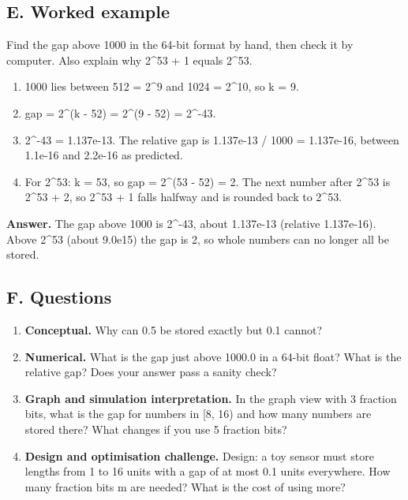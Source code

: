\documentclass[11pt,a4paper]{article}
\begin{document}
\subsection*{E. Worked example}
Find the gap above 1000 in the 64-bit format by hand, then check it by computer. Also explain why 2\textasciicircum{}53 + 1 equals 2\textasciicircum{}53.
\begin{enumerate}[nosep]
\item 1000 lies between 512 = 2\textasciicircum{}9 and 1024 = 2\textasciicircum{}10, so k = 9.
\item gap = 2\textasciicircum{}(k - 52) = 2\textasciicircum{}(9 - 52) = 2\textasciicircum{}-43.
\item 2\textasciicircum{}-43 = 1.137e-13. The relative gap is 1.137e-13 / 1000 = 1.137e-16, between 1.1e-16 and 2.2e-16 as predicted.
\item For 2\textasciicircum{}53: k = 53, so gap = 2\textasciicircum{}(53 - 52) = 2. The next number after 2\textasciicircum{}53 is 2\textasciicircum{}53 + 2, so 2\textasciicircum{}53 + 1 falls halfway and is rounded back to 2\textasciicircum{}53.
\end{enumerate}
\textbf{Answer.} The gap above 1000 is 2\textasciicircum{}-43, about 1.137e-13 (relative 1.137e-16). Above 2\textasciicircum{}53 (about 9.0e15) the gap is 2, so whole numbers can no longer all be stored.

\subsection*{F. Questions}
\begin{enumerate}[nosep]
\item \textbf{Conceptual.} Why can 0.5 be stored exactly but 0.1 cannot?
\item \textbf{Numerical.} What is the gap just above 1000.0 in a 64-bit float? What is the relative gap? Does your answer pass a sanity check?
\item \textbf{Graph and simulation interpretation.} In the graph view with 3 fraction bits, what is the gap for numbers in [8, 16) and how many numbers are stored there? What changes if you use 5 fraction bits?
\item \textbf{Design and optimisation challenge.} Design: a toy sensor must store lengths from 1 to 16 units with a gap of at most 0.1 units everywhere. How many fraction bits m are needed? What is the cost of using more?
\end{enumerate}
\end{document}
